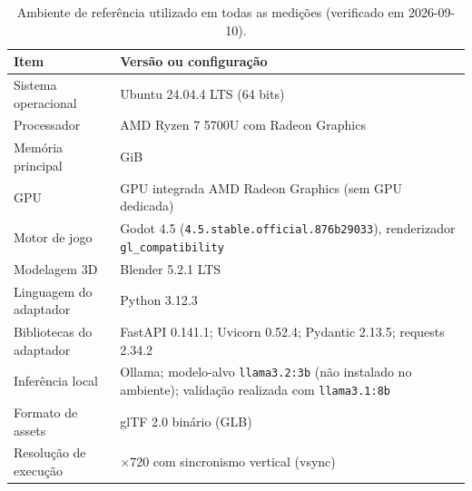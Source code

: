 \begin{table}[htbp]
\centering
\caption{Ambiente de referência utilizado em todas as medições (verificado em 2026-09-10).}
\label{tab:ambiente}
\footnotesize
\begin{tabular}{@{}>{\raggedright\arraybackslash}p{4.4cm} >{\raggedright\arraybackslash}p{9.4cm}@{}}
\toprule
Item & Versão ou configuração \\
\midrule
Sistema operacional & Ubuntu 24.04.4 LTS (64 bits) \\
Processador & AMD Ryzen 7 5700U com Radeon Graphics \\
Memória principal & 30 GiB \\
GPU & GPU integrada AMD Radeon Graphics (sem GPU dedicada) \\
Motor de jogo & Godot 4.5 (\texttt{4.5.stable.official.876b29033}), renderizador \texttt{gl\_compatibility} \\
Modelagem 3D & Blender 5.2.1 LTS \\
Linguagem do adaptador & Python 3.12.3 \\
Bibliotecas do adaptador & FastAPI 0.141.1; Uvicorn 0.52.4; Pydantic 2.13.5; requests 2.34.2 \\
Inferência local & Ollama; modelo-alvo \texttt{llama3.2:3b} (não instalado no ambiente); validação realizada com \texttt{llama3.1:8b} \\
Formato de assets & glTF 2.0 binário (GLB) \\
Resolução de execução & 1280$\times$720 com sincronismo vertical (vsync) \\
\bottomrule
\end{tabular}
\par\vspace{2pt}{\footnotesize Fonte: elaborado pelo autor (2026); valores obtidos por comando na máquina de referência.}
\end{table}
